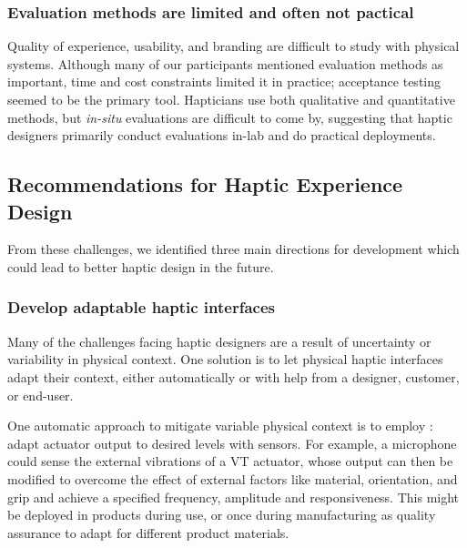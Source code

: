     
    \subsubsection{Evaluation methods are limited and often not pactical}
    \noindent
    Quality of experience, usability, and branding are difficult to study with physical systems.
    Although many of our participants mentioned evaluation methods as important, time and cost constraints limited it in practice; %
    acceptance testing seemed to be the primary tool. %
    Hapticians use both qualitative and quantitative methods, but \emph{in-situ} evaluations are difficult to come by, suggesting that haptic designers primarily conduct evaluations in-lab and do practical deployments. %



\subsection{Recommendations for Haptic Experience Design}
\noindent
From these challenges, we identified three main directions for development which %
could lead to better haptic design in the future.

\subsubsection{Develop adaptable haptic interfaces}
\noindent
    Many of the challenges facing haptic designers are a result of uncertainty or variability in physical context.
    One solution is to  let physical haptic interfaces adapt their context, either automatically or with help from a designer, customer, or end-user.
    
    One automatic approach to mitigate variable physical context is to employ : adapt actuator output to desired levels with sensors.
    For example, a microphone could  sense the external vibrations of a VT actuator, {whose}  output can then be modified to overcome the effect of external factors like material, orientation, and grip and achieve a specified frequency, amplitude and responsiveness. 
    This might be deployed in products during use, or once during manufacturing as quality assurance to adapt for different product materials.

